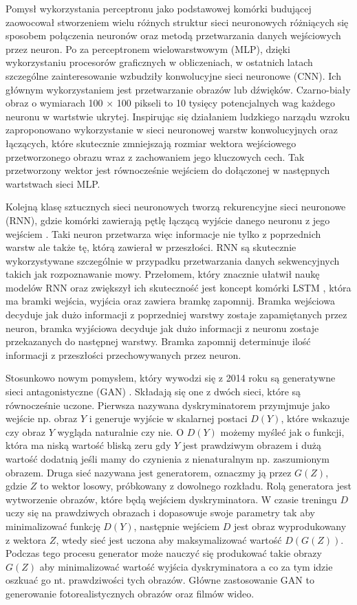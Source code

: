 \documentclass[11pt]{book}
\theoremstyle{definition}
\begin{document}
Pomysł wykorzystania perceptronu jako podstawowej komórki budującej zaowocował stworzeniem wielu różnych struktur sieci neuronowych różniących się sposobem połączenia neuronów oraz metodą przetwarzania danych wejściowych przez neuron. Po za perceptronem wielowarstwowym (MLP), dzięki wykorzystaniu procesorów graficznych w obliczeniach, w ostatnich latach szczególne zainteresowanie wzbudziły konwolucyjne sieci neuronowe (CNN). Ich głównym wykorzystaniem jest przetwarzanie obrazów lub dźwięków. Czarno-biały obraz o wymiarach 100 $\times$ 100 pikseli to 10 tysięcy potencjalnych wag każdego neuronu w wartstwie ukrytej. Inspirując się działaniem ludzkiego narządu wzroku zaproponowano \cite{Lecun98gradient-basedlearning} wykorzystanie w sieci neuronowej warstw konwolucyjnych oraz łączących, które skutecznie zmniejszają rozmiar wektora wejściowego przetworzonego obrazu wraz z zachowaniem jego kluczowych cech. Tak przetworzony wektor jest równocześnie wejściem do dołączonej w następnych wartstwach sieci MLP. 

Kolejną klasę sztucznych sieci neuronowych tworzą rekurencyjne sieci neuronowe (RNN), gdzie komórki zawierają pętlę łączącą wyjście danego neuronu z jego wejściem \cite{1990RNN}. Taki neuron przetwarza więc informacje nie tylko z poprzednich warstw ale także tę, którą zawierał w przeszłości. RNN są skutecznie wykorzystywane szczególnie w przypadku przetwarzania danych sekwencyjnych takich jak rozpoznawanie mowy. Przełomem, który znacznie ułatwił naukę modelów RNN oraz zwiększył ich skuteczność jest koncept komórki LSTM \cite{hochreiter1997long}, która ma bramki wejścia, wyjścia oraz zawiera bramkę zapomnij. Bramka wejściowa decyduje jak dużo informacji z poprzedniej warstwy zostaje zapamiętanych przez neuron, bramka wyjściowa decyduje jak dużo informacji z neuronu zostaje przekazanych do następnej warstwy. Bramka zapomnij determinuje ilość informacji z przeszłości przechowywanych przez neuron.

Stosunkowo nowym pomysłem, który wywodzi się z 2014 roku są generatywne sieci antagonistyczne (GAN) \cite{2014arXiv1406.2661G}. Składają się one z dwóch sieci, które są równocześnie uczone. Pierwsza nazywana dyskryminatorem przymjmuje jako wejście np. obraz $Y$ i generuje wyjście w skalarnej postaci $D(Y)$, które wskazuje czy obraz $Y$ wygląda naturalnie czy nie. O $D(Y)$ możemy myśleć jak o funkcji, która ma niską wartość bliską zeru gdy $Y$ jest prawdziwym obrazem i dużą wartość dodatnią jeśli mamy do czynienia z nienaturalnym np. zaszumionym obrazem. Druga sieć nazywana jest generatorem, oznaczmy ją przez $G(Z)$, gdzie $Z$ to wektor losowy, próbkowany z dowolnego rozkładu. Rolą generatora jest wytworzenie obrazów, które będą wejściem dyskryminatora. W czasie treningu $D$ uczy się na prawdziwych obrazach i dopasowuje swoje parametry tak aby minimalizować funkcję $D(Y)$, następnie wejściem $D$ jest obraz wyprodukowany z wektora $Z$, wtedy sieć jest uczona aby maksymalizować wartość $D(G(Z))$. Podczas tego procesu generator może nauczyć się produkować takie obrazy $G(Z)$ aby minimalizować wartość wyjścia dyskryminatora a co za tym idzie oszkuać go nt. prawdziwości tych obrazów. Główne zastosowanie GAN to generowanie fotorealistycznych obrazów oraz filmów wideo.
\end{document}
